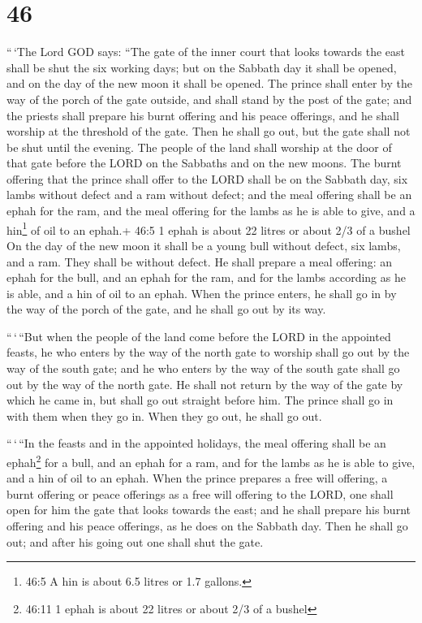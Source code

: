 \hypertarget{section-44}{%
\section{46}\label{section-44}}

 ``\,`The Lord GOD says: ``The gate of the inner court that
looks towards the east shall be shut the six working days; but on the
Sabbath day it shall be opened, and on the day of the new moon it shall
be opened.  The prince shall enter by the way of the porch
of the gate outside, and shall stand by the post of the gate; and the
priests shall prepare his burnt offering and his peace offerings, and he
shall worship at the threshold of the gate. Then he shall go out, but
the gate shall not be shut until the evening.  The people of
the land shall worship at the door of that gate before the LORD on the
Sabbaths and on the new moons.  The burnt offering that the
prince shall offer to the LORD shall be on the Sabbath day, six lambs
without defect and a ram without defect;  and the meal
offering shall be an ephah for the ram, and the meal offering for the
lambs as he is able to give, and a hin\footnote{46:5 A hin is about 6.5
  litres or 1.7 gallons.} of oil to an ephah.+ 46:5 1 ephah is about 22
litres or about 2/3 of a bushel  On the day of the new moon
it shall be a young bull without defect, six lambs, and a ram. They
shall be without defect.  He shall prepare a meal offering:
an ephah for the bull, and an ephah for the ram, and for the lambs
according as he is able, and a hin of oil to an ephah.  When
the prince enters, he shall go in by the way of the porch of the gate,
and he shall go out by its way.

 ``\,`\,``But when the people of the land come before the
LORD in the appointed feasts, he who enters by the way of the north gate
to worship shall go out by the way of the south gate; and he who enters
by the way of the south gate shall go out by the way of the north gate.
He shall not return by the way of the gate by which he came in, but
shall go out straight before him.  The prince shall go in
with them when they go in. When they go out, he shall go out.

 ``\,`\,``In the feasts and in the appointed holidays, the
meal offering shall be an ephah\footnote{46:11 1 ephah is about 22
  litres or about 2/3 of a bushel} for a bull, and an ephah for a ram,
and for the lambs as he is able to give, and a hin of oil to an ephah.
 When the prince prepares a free will offering, a burnt
offering or peace offerings as a free will offering to the LORD, one
shall open for him the gate that looks towards the east; and he shall
prepare his burnt offering and his peace offerings, as he does on the
Sabbath day. Then he shall go out; and after his going out one shall
shut the gate.

